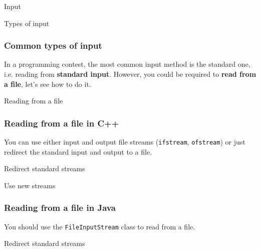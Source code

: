 \documentclass{beamer}
\newcommand{\source}[1]{
	
}
\begin{document}
\begin{section}{Input}
\begin{subsection}{Types of input}
\begin{frame}[fragile]
	\frametitle{Common types of input}
	In a programming contest, the most common input method is the standard one, i.e. reading from \textbf{standard input}. However, you could be required to \textbf{read from a file}, let's see how to do it.
\end{frame}
\end{subsection}

\begin{subsection}{Reading from a file}
\begin{frame}[fragile]
	\frametitle{Reading from a file in C++}
	You can use either input and output file streams (\texttt{ifstream}, \texttt{ofstream}) or just redirect the standard input and output to a file.
	\pause
	\begin{block}{Redirect standard streams}
		\source{./src/fileredirect.cpp}
	\end{block}
	\pause
	\begin{block}{Use new streams}
		\source{./src/filestreams.cpp}
	\end{block}
\end{frame}

\begin{frame}[fragile]
	\frametitle{Reading from a file in Java}
	You should use the \texttt{FileInputStream} class to read from a file.
	\pause
	\begin{block}{Redirect standard streams}
		\source{./src/fileinputstream.java}
	\end{block}
\end{frame}
\end{subsection}


\end{section}
\end{document}

